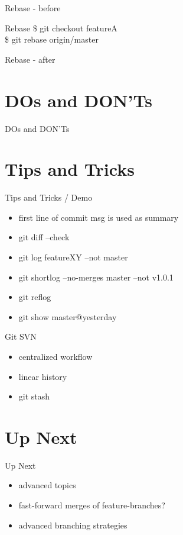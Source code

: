 \documentclass{beamer}
\begin{document}
\begin{frame}{Rebase - before}
    \centering
    \hfill\vfill
\end{frame}

\begin{frame}{Rebase}
  \$ git checkout featureA\\
  \$ git rebase origin/master\\
\end{frame}

\begin{frame}{Rebase - after}
    \centering
    \hfill\vfill
\end{frame}

\section{DOs and DON'Ts}

\begin{frame}{DOs and DON'Ts}
\end{frame}


\section{Tips and Tricks}

\begin{frame}{Tips and Tricks / Demo}
  \begin{itemize}
    \item
      first line of commit msg is used as summary
    \item
      git diff --check
    \item
      git log featureXY --not master
    \item
      git shortlog --no-merges master --not v1.0.1
    \item
      git reflog
    \item
      git show master@{yesterday}
  \end{itemize}
\end{frame}


\begin{frame}{Git SVN}
  \begin{itemize}
    \item
      centralized workflow
    \item
      linear history
    \item
      git stash
  \end{itemize}
\end{frame}


\section{Up Next}

\begin{frame}{Up Next}
  \begin{itemize}
    \item
      advanced topics
    \item
      fast-forward merges of feature-branches?
    \item
      advanced branching strategies
  \end{itemize}
\end{frame}
\end{document}
